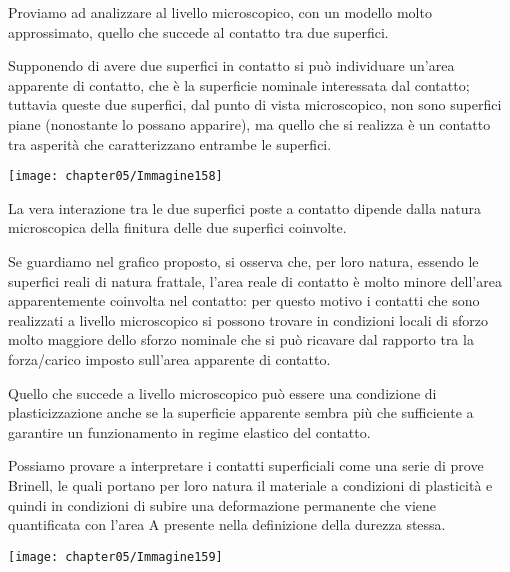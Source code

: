Proviamo ad analizzare al livello microscopico, con un modello molto approssimato, quello che succede al contatto tra due superfici.
\vspace{1mm}

\begin{minipage}{.5\textwidth}
Supponendo di avere due superfici in contatto si può individuare un'area apparente di contatto, che è la superficie nominale interessata dal contatto; tuttavia queste due superfici, dal punto di vista microscopico, non sono superfici piane (nonostante lo possano apparire), ma quello che si realizza è un contatto tra asperità che caratterizzano entrambe le superfici.
\end{minipage}
\hfill
\begin{minipage}{.5\textwidth}
\centering
\texttt{[image: chapter05/Immagine158]}
\end{minipage}
\vspace{1mm}

La vera interazione tra le due superfici poste a contatto dipende dalla natura microscopica della finitura delle due superfici coinvolte.

Se guardiamo nel grafico proposto, si osserva che, per loro natura, essendo le superfici reali di natura frattale, l'area reale di contatto è molto minore dell'area apparentemente coinvolta nel contatto: per questo motivo i contatti che sono realizzati a livello microscopico si possono trovare in condizioni locali di sforzo molto maggiore dello sforzo nominale che si può ricavare dal rapporto tra la forza/carico imposto sull'area apparente di contatto.

Quello che succede a livello microscopico può essere una condizione di plasticizzazione anche se la superficie apparente sembra più che sufficiente a garantire un funzionamento in regime elastico del contatto.

\begin{minipage}{.5\textwidth}
Possiamo provare a interpretare i contatti superficiali come una serie di prove Brinell, le quali portano per loro natura il materiale a condizioni di plasticità e quindi in condizioni di subire una deformazione permanente che viene quantificata con l'area A presente nella definizione della durezza stessa.
\end{minipage}
\hfill
\begin{minipage}{.5\textwidth}
\centering
\texttt{[image: chapter05/Immagine159]}
\end{minipage}

